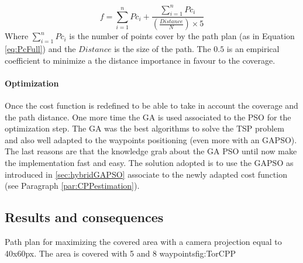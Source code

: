   \begin{equation} \label{eq:CostF2}
f=\sum_{i=1}^{n}Pc_i + \frac{\sum_{i=1}^{n}Pc_i}{(\frac{Distance}{N})\times 5}  
\end{equation}  %
Where $\sum_{i=1}^{n}Pc_i$ is the number of points cover by the path plan (as  in  Equation \ref{eq:PcFull}) and the $Distance$  is  the size of the path. The $0.5$ is an empirical coefficient to minimize a the distance importance in favour to the coverage.



\paragraph*{Optimization}
 Once the cost function is redefined to be able to take in account the coverage and the path distance.
One more time the GA is used associated to the PSO for the optimization step. %
The GA was the best algorithms to solve the TSP problem and also well adapted to the waypoints positioning (even more with an GAPSO). The last reasons are that the knowledge grab about the GA PSO until now make the implementation fast and easy.
 The solution adopted is to use the GAPSO as introduced in \ref{sec:hybridGAPSO} associate to the newly adapted cost function (see Paragraph \ref{par:CPPestimation}).


		\subsection{Results  and consequences }
\begin{mfigures}[!]{Path plan for maximizing the covered area with a camera projection  equal to 40x60px. The area is covered  with 5 and 8 waypoints}{fig:TorCPP} \centering
{}
\hspace{1cm}

\hspace{1cm}
\end{mfigures}
		

